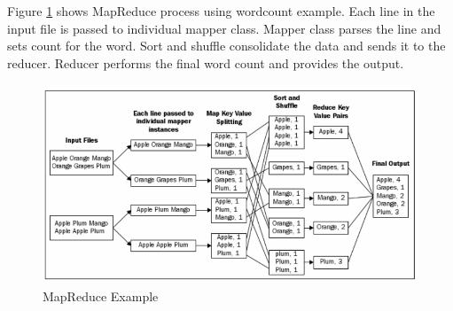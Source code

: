 \documentclass[sigconf]{acmart}
\begin{document}
Figure \ref{f:mapreduceex} shows MapReduce process using wordcount example. Each line in the input file is passed to individual mapper class. Mapper class parses the line and sets count for the word. Sort and shuffle consolidate the data and sends it to the reducer. Reducer performs the final word count and provides the output.  
\begin{figure}[!ht]
  \centering\includegraphics[width=\columnwidth]{images/mapReduceEx.PNG}
  \caption{MapReduce Example \cite[Ch.\ 3, p. 48]{AchariShiva2015HE}}\label{f:mapreduceex}
\end{figure}
\end{document}
